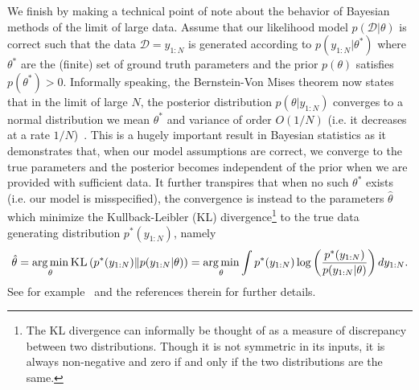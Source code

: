 We finish by making a technical point of note about the behavior of Bayesian methods of the limit of large
data.  Assume that our likelihood model $p(\mathcal{D}|\theta)$ is correct such that the data $\mathcal{D} = y_{1:N}$
is generated according to 
$p(y_{1:N} | \theta^*)$ where $\theta^*$ are the (finite) set of ground truth parameters 
and the prior $p(\theta)$ satisfies $p(\theta^*)>0$.  Informally speaking, the Bernstein-Von Mises theorem now states
that in the limit of large $N$, the posterior distribution $p(\theta | y_{1:N})$ converges to a normal distribution 
we mean $\theta^*$ and variance of order $O(1/N)$ 
(i.e. it decreases at a rate $1/N$)~\citep{doob1949application,freedman1963asymptotic}.  This is a hugely important
result in Bayesian statistics as it demonstrates that, when our model assumptions are correct, we converge to the true parameters 
and the posterior becomes independent of the prior when we are provided with sufficient data.  It further transpires that when no such $\theta^*$ exists (i.e. our model is misspecified), the convergence
is instead to the parameters $\hat{\theta}$ which minimize the Kullback-Leibler (KL) divergence\footnote{The KL divergence
	can informally be thought of as a measure of discrepancy between two distributions.  Though
	it is not symmetric in its inputs, it is always non-negative and zero if and only if the two distributions are the same.} to the true data generating
distribution $p^*(y_{1:N})$, namely
\begin{align}
\hat{\theta} = \operatorname*{arg\,min}_{\theta} \textsc{KL}\left(p^*(y_{1:N}) \| p(y_{1:N} | \theta)\right)
= \operatorname*{arg\,min}_{\theta} \int p^*(y_{1:N}) \log \left(\frac{p^*(y_{1:N})}{p(y_{1:N}|\theta)}\right) dy_{1:N}.
\end{align}
See for example~\citep{kleijn2012bernstein} and the references therein for further details.